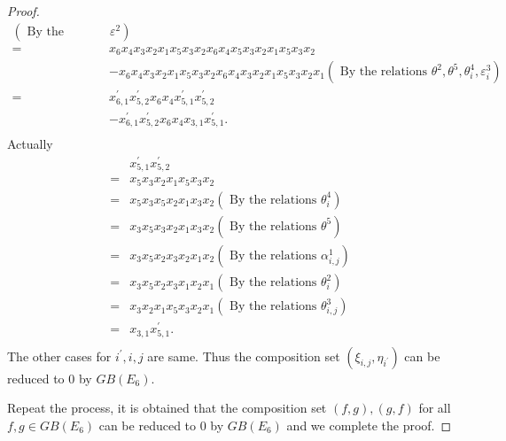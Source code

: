 \documentclass[UTF8]{amsart}
\theoremstyle{definition}
\theoremstyle{remark}
\numberwithin{equation}{section}
\begin{document}
\begin{proof}
\begin{align*}
 (\mbox{ By the relations }\varepsilon^2)\\
 =&x_{6}x_4x_3x_2x_1x_5x_{3}x_2x_{6}x_4x_5x_3x_2x_1x_{5}x_3x_2\\
 &-x_6x_{4}x_3x_2x_1x_{5}x_3x_2x_6x_{4}x_3x_2x_1x_{5}x_3x_2x_1 (\mbox{ By the relations } \theta^2, \theta^5, \theta_i^4, \varepsilon_i^3)  \\
=&x_{6,1}^{'}x_{5,2}^{'}x_6x_4x_{5,1}^{'}x_{5,2}^{'}\\
&-x_{6,1}^{'}x_{5,2}^{'}x_6x_{4}x_{3,1}x_{5,1}^{'}.\\
\end{align*}
Actually
\begin{align*}
 &x_{5,1}^{'}x_{5,2}^{'}\\
 =&x_5x_3x_2x_1x_{5}x_3x_2\\
 =&x_5x_3x_{5}x_2x_1x_3x_2 (\mbox{ By the relations }\theta_i^4)\\
  =&x_3x_5x_{3}x_2x_1x_3x_2 (\mbox{ By the relations }\theta^5)\\
 =&x_3x_5x_2x_{3}x_2x_1x_2 (\mbox{ By the relations }\alpha_{i,j}^1)\\
 =&x_3x_5x_2x_{3}x_1x_2x_1 (\mbox{ By the relations }\theta_i^2)\\
 =&x_3x_2x_1x_5x_{3}x_2x_1 (\mbox{ By the relations }\theta_{i,j}^3)\\
 =&x_{3,1}x_{5,1}^{'}.\\
\end{align*}
The other cases for $i^{'},i,j$ are same. Thus the composition set $(\xi_{i,j},\eta_{i^{'}})$ can be reduced to $0$ by $GB(E_6)$.\par
Repeat the process, it is obtained that the composition set $(f,g), (g,f)$ for all $f,g\in GB(E_6)$ can be reduced to $0$ by $GB(E_6)$ and we complete the proof.
\end{proof}
\end{document}
